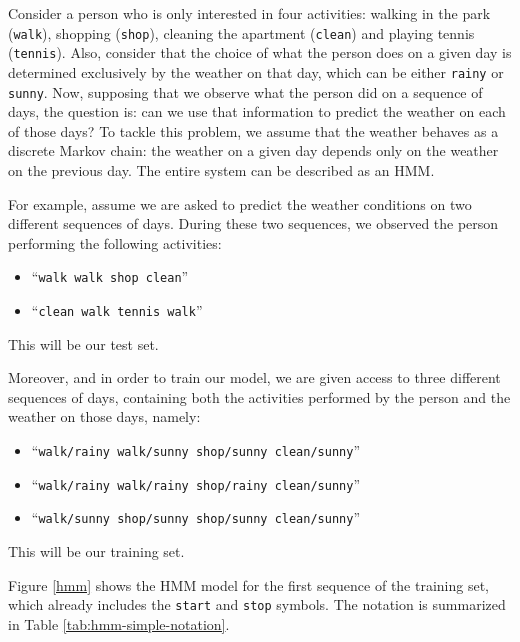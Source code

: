 \begin{example}

Consider a person who is only interested in four activities: walking in the park ({\tt walk}), shopping ({\tt shop}), cleaning the apartment ({\tt clean}) and playing tennis ({\tt tennis}).
Also, consider that the choice of what the person does on a given day is determined exclusively by the weather on that day, which can be either {\tt rainy} or {\tt sunny}. 
Now, supposing that we observe what the person did on a sequence of days, the question is: 
can we use that information to predict the weather on each of those days? 
To tackle this problem, we assume 
that the weather behaves as a discrete Markov chain: the weather on a
given day depends only on 
the weather on the previous day. 
The entire system can be described as an HMM.

For example, assume we are asked to predict the weather conditions on two different
sequences of days. During these two sequences, we observed the person performing the following activities: 
\begin{itemize}
\item ``{\tt walk walk shop clean}'' 
\item ``{\tt clean walk tennis walk}''
\end{itemize}
This will be our test set.

Moreover, and in order to train our model, we are given access to three different sequences of days, containing both the activities performed by the person and the weather on those days, namely: 
\begin{itemize}
\item ``{\tt walk/rainy walk/sunny shop/sunny clean/sunny}'' 
\item ``{\tt walk/rainy walk/rainy shop/rainy clean/sunny}''
\item ``{\tt walk/sunny shop/sunny shop/sunny clean/sunny}''
\end{itemize}
This will be our training set.


Figure \ref{hmm} shows the HMM model for the first sequence of the training set, which already includes the {\tt start} and 
{\tt stop} symbols. The notation is summarized in Table \ref{tab:hmm-simple-notation}.
\end{example}
 
